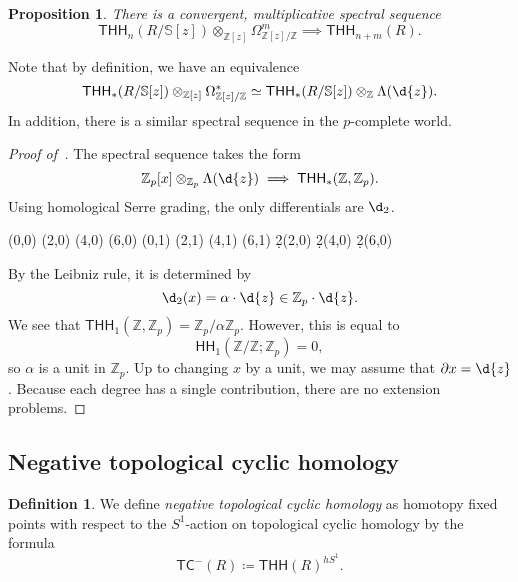 \documentclass[10pt, oneside]{memoir}
\newtheorem{prop}[thm]{Proposition}
\theoremstyle{definition}
\newtheorem{defn}[thm]{Definition}
\theoremstyle{remark}
\theoremstyle{plain}
\theoremstyle{definition}
\theoremstyle{remark}
\newcommand{\Z}{\mathbb{Z}}
\newcommand{\bS}{\mathbb{S}}
\newcommand{\ms}[1]{\mathsf{#1}}
\newcommand{\1}{\mathbf{1}}
\newcommand{\2}{\mathbf{2}}
\newcommand{\3}{\mathbf{3}}
\newcommand{\THH}{\ms{THH}}
\newcommand{\TC}{\ms{TC}}
\newcommand{\HH}{\ms{HH}}
\begin{document}
\begin{prop}
    There is a convergent, multiplicative spectral sequence
    \[ \THH_n(R/\bS[z]) \otimes_{\Z[z]} \Omega^m_{\Z[z]/\Z} \implies \THH_{n+m}(R). \]
\end{prop}

Note that by definition, we have an equivalence
\[ \THH_*(R / \bS[z]) \otimes_{\Z[z]} \Omega^*_{\Z[z]/\Z} \simeq \THH_*(R/\bS[z]) \otimes_{\Z} \Lambda(\d{z}). \]
In addition, there is a similar spectral sequence in the $p$-complete world.

\begin{proof}[Proof of~]
    The spectral sequence takes the form
    \[ \Z_p[x] \otimes_{\Z_p} \Lambda(\d{z}) \implies \THH_*(\Z, \Z_p). \]
    Using homological Serre grading, the only differentials are $\d_2$.
    \begin{center}
        \begin{sseqdata}[classes={draw=none}, name=thhz, homological Serre
            grading, xscale=1, y axis gap = 2em, axes type = frame] 
            \class["1"](0,0) 
            \class["x"](2,0)
            \class["x^2"](4,0)
            \class["x^3"](6,0)
            \class["dz"](0,1)
            \class["x \cdot dz"](2,1)
            \class["x^2 \cdot dz"](4,1)
            \class["x^3 \cdot dz"](6,1)
            \d2(2,0)
            \d2(4,0)
            \d2(6,0)
        \end{sseqdata} 
        \printpage[name=thhz, page=2] 
    \end{center}
    By the Leibniz rule, it is determined by
    \[ \d_2(x) = \alpha \cdot \d{z} \in \Z_p \cdot \d{z}. \]
    We see that $\THH_1(\Z, \Z_p) = \Z_p / \alpha \Z_p$. However, this is equal to
    \[ \HH_1(\Z/\Z; \Z_p) = 0, \]
    so $\alpha$ is a unit in $\Z_p$. Up to changing $x$ by a unit, we may assume that $\partial x = \d{z}$. Because each degree has a single contribution, there are no extension problems.
\end{proof}


\subsection{Negative topological cyclic homology}%
\label{sub:Negative topological cyclic homology}

\begin{defn}
    We define \textit{negative topological cyclic homology} as homotopy fixed points with respect to the $S^1$-action on topological cyclic homology by the formula
    \[ \TC^-(R) \coloneqq \THH(R)^{h S^1}. \]
\end{defn}
\end{document}
